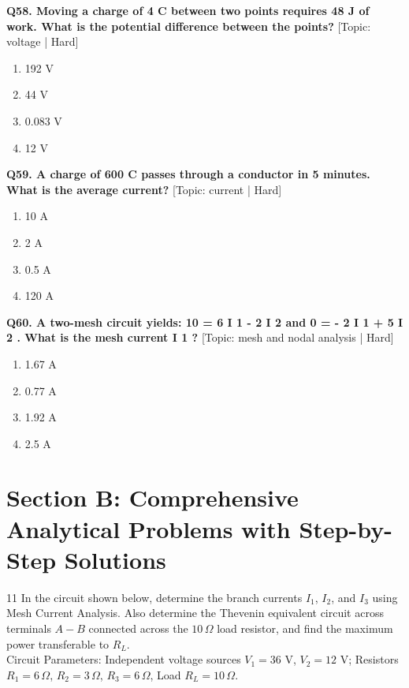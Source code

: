 \noindent\textbf{Q58. Moving a charge of 4 C between two points requires 48 J of work. What is the potential difference between the points?} \hfill [Topic: voltage | Hard]
\begin{enumerate}[label=(\alph*),topsep=2pt,itemsep=1pt,partopsep=0pt,parsep=0pt]
    \item {192 V}
    \item {44 V}
    \item {0.083 V}
    \item {12 V}
\end{enumerate}
\vspace{2mm}

\noindent\textbf{Q59. A charge of 600 C passes through a conductor in 5 minutes. What is the average current?} \hfill [Topic: current | Hard]
\begin{enumerate}[label=(\alph*),topsep=2pt,itemsep=1pt,partopsep=0pt,parsep=0pt]
    \item {10 A}
    \item {2 A}
    \item {0.5 A}
    \item {120 A}
\end{enumerate}
\vspace{2mm}

\noindent\textbf{Q60. A two-mesh circuit yields: 10 = 6 I 1 - 2 I 2 and 0 = - 2 I 1 + 5 I 2 . What is the mesh current I 1 ?} \hfill [Topic: mesh and nodal analysis | Hard]
\begin{enumerate}[label=(\alph*),topsep=2pt,itemsep=1pt,partopsep=0pt,parsep=0pt]
    \item {1.67 A}
    \item {0.77 A}
    \item {1.92 A}
    \item {2.5 A}
\end{enumerate}
\vspace{2mm}


\newpage
\section{Section B: Comprehensive Analytical Problems with Step-by-Step Solutions}

\begin{subjectiveq}{1}{1}
In the circuit shown below, determine the branch currents $I_1$, $I_2$, and $I_3$ using Mesh Current Analysis. Also determine the Thevenin equivalent circuit across terminals $A-B$ connected across the $10\,\Omega$ load resistor, and find the maximum power transferable to $R_L$.\\[2mm]Circuit Parameters: Independent voltage sources $V_1 = 36\text{ V}$, $V_2 = 12\text{ V}$; Resistors $R_1 = 6\,\Omega$, $R_2 = 3\,\Omega$, $R_3 = 6\,\Omega$, Load $R_L = 10\,\Omega$.
\end{subjectiveq}


